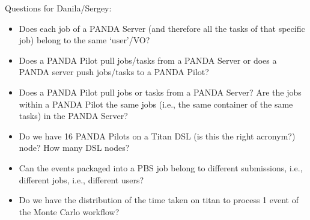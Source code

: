 Questions for Danila/Sergey:
\begin{itemize}
    \item Does each job of a PANDA Server (and therefore all the tasks of that specific job) belong to the same `user'/VO\@?
    \item Does a PANDA Pilot pull jobs/tasks from a PANDA Server or does a PANDA server push jobs/tasks to a PANDA Pilot?
    \item Does a PANDA Pilot pull jobs or tasks from a PANDA Server? Are the jobs within a PANDA Pilot the same jobs (i.e., the same container of the same tasks) in the PANDA Server?
    \item Do we have 16 PANDA Pilots on a Titan DSL (is this the right acronym?) node? How many DSL nodes?
    \item Can the events packaged into a PBS job belong to different submissions, i.e., different jobs, i.e., different users?
    \item Do we have the distribution of the time taken on titan to process 1 event of the Monte Carlo workflow?
\end{itemize}
